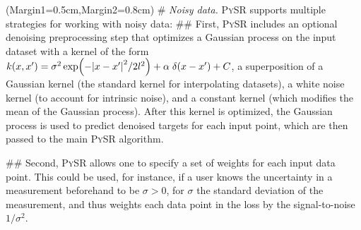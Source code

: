 \documentclass[letterpaper,twocolumn]{scrartcl}
\newcommand\pysr{\textsc{PySR}\xspace}
\begin{document}
\begin{easylist}[itemize]
\ListProperties(Margin1=0.5cm,Margin2=0.8cm)
# \textit{Noisy data.} \pysr supports multiple strategies for working with noisy data:
## First, \pysr includes an optional denoising preprocessing step that optimizes a Gaussian process on the input dataset with a kernel of the form $k(x,x')=\sigma^2\exp(-\abs{x-x'}^2 / 2 l^2) + \alpha\;\delta(x-x') + C$, a superposition of a Gaussian kernel (the standard kernel for interpolating datasets), a white noise kernel (to account for intrinsic noise), and a constant kernel (which modifies the mean of the Gaussian process).
After this kernel is optimized, the Gaussian process is used to predict denoised targets for each input point, which are then passed to the main \pysr algorithm.

## Second, \pysr allows one to specify a set of weights for each input data point. This could be used, for instance, if a user knows the uncertainty in a measurement beforehand to be $\sigma>0$, for $\sigma$ the standard deviation of the measurement, and thus weights each data point in the loss by the signal-to-noise $1/\sigma^2$.


\end{easylist}
\end{document}
